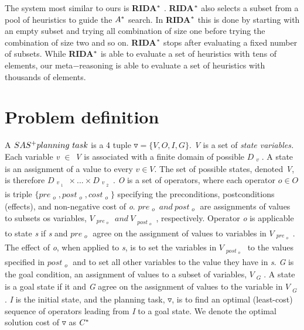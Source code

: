 The system most similar to ours is \textbf{RIDA$\sp{*}$} \cite{BarleySantiagoOver}. \textbf{RIDA$\sp{*}$} also selects a subset from a pool of heuristics to guide the $A\sp{*}$ search. In \textbf{RIDA$\sp{*}$} this is done by starting with an empty subset and trying all combination of size one before trying the combination of size two and so on. \textbf{RIDA$\sp{*}$} stops after evaluating a fixed number of subsets. While \textbf{RIDA$\sp{*}$} is able to evaluate a set of heuristics with tens of elements, our meta$-$reasoning is able to evaluate a set of heuristics with thousands of elements.

\section{Problem definition}

A $SAS\sp{+} planning\ task$ \cite{backstrom1995complexity} is a 4 tuple $\triangledown = \{V, O, I, G\}.$ \textit{V} is a set of \textit{state variables.} Each variable \textit{v} $\in$ \textit{V} is associated with a finite domain of possible $D_{\substack{v}}$. A state is an assignment of a value to every $v \in V.$ The set of possible states, denoted \textit{V}, is therefore $D_{\substack{v_{\substack{1}}}}    \times ... \times D_{\substack{v_{\substack{2}}}}$. \textit{O} is a set of operators, where each operator $o \in O$ is triple $\{pre_{\substack{o}} , post_{\substack{o}}, cost_{\substack{o}}\}$ specifying the preconditions, postconditions (effects), and non-negative cost of \textit{o}. $pre_{\substack{o}}\ and\ post_{\substack{o}}$ are assignments of values to subsets os variables, $V_{\substack{pre_{\substack{o}}}}\ and\ V_{\substack{post_{\substack{o}}}}$, respectively. Operator \textit{o} is applicable to state \textit{s} if \textit{s} and $pre_{\substack{o}}$ agree on the assignment of values to variables in $V_{\substack{pre_{\substack{o}}}}$. The effect of \textit{o}, when applied to \textit{s}, is to set the variables in $V_{\substack{post_{\substack{o}}}}$ to the values specified in $post_{\substack{o}}$ and to set all other variables to the value they have in \textit{s}. \textit{G} is the goal condition, an assignment of values to a subset of variables, $V_{\substack{G}}$. A state is a goal state if it and \textit{G} agree on the assignment of values to the variable in $V_{\substack{G}}$. \textit{I} is the initial state, and the planning task, $\triangledown$, is to find an optimal (least-cost) sequence of operators leading from \textit{I} to a goal state. We denote the optimal solution cost of $\triangledown$ as $C\sp{*}$ \\

